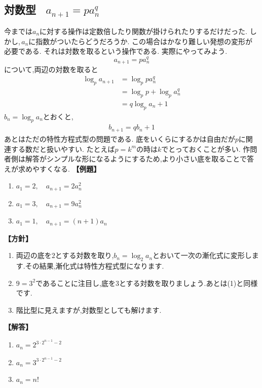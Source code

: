 \documentclass[dvipdfmx,a4paper,11pt,fleqn,openany]{jsbook}
\begin{document}
  \subsection{対数型 \, $a_{n+1}=pa_n^q$}
    今までは$a_n$に対する操作は定数倍したり関数が掛けられたりするだけだった.
    しかし,\,$a_n$に指数がついたらどうだろうか.
    この場合はかなり難しい発想の変形が必要である.
    それは対数を取るという操作である.
    実際にやってみよう.
    \[
      a_{n+1}=pa_n^q
    \]
    について,両辺の対数を取ると
    \begin{align*}
      \log_p{a_{n+1}}&=\log_p{pa_n^q}\\
      &=\log_p{p}+\log_p{a_n^q}\\
      &=q\log_p{a_n}+1
    \end{align*}
    $b_n=\log_p{a_n}$とおくと,
    \begin{align*}
      b_{n+1}=qb_n+1
    \end{align*}
    あとはただの特性方程式型の問題である.
    底をいくらにするかは自由だが$p$に関連する数だと扱いやすい.
    たとえば$p=k^m$の時は$k$でとっておくことが多い.
    作問者側は解答がシンプルな形になるようにするため,より小さい底を取ることで答えが求めやすくなる.
    \noindent\textbf{【例題】}
    \begin{enumerate}[label=(\arabic*),parsep=3pt]
      \item $\displaystyle a_1=2,\quad a_{n+1}=2a_n^2$
      \item $\displaystyle a_1=3,\quad a_{n+1}=9a_n^2$
      \item $\displaystyle a_1=1,\quad a_{n+1}=(n+1)a_n$
    \end{enumerate}

    \noindent\textbf{【方針】}
    \begin{enumerate}[label=(\arabic*),parsep=3pt]
      \item 両辺の底を$2$とする対数を取り,$b_n=\log_2a_n$とおいて一次の漸化式に変形します.その結果,漸化式は特性方程式型になります.
      \item $9=3^2$であることに注目し,底を$3$とする対数を取りましょう.あとは(1)と同様です.
      \item 階比型に見えますが,対数型としても解けます.
    \end{enumerate}

    \noindent\textbf{【解答】}
    \begin{enumerate}[label=(\arabic*),parsep=3pt]
      \item $\displaystyle a_n=2^{3\cdot2^{n-1}-2}$
      \item $a_n=3^{3\cdot2^{n-1}-2}$
      \item $a_n=n!$
    \end{enumerate}
\end{document}
